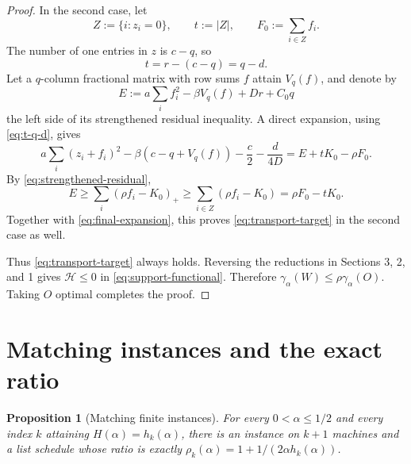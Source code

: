 \documentclass[11pt]{article}
\newtheorem{proposition}[theorem]{Proposition}
\theoremstyle{remark}
\begin{document}
\begin{proof}
In the second case, let
\[
 Z:=\{i:z_i=0\},\qquad t:=|Z|,\qquad
 F_0:=\sum_{i\in Z}f_i.
\]
The number of one entries in $z$ is $c-q$, so
\begin{equation}\label{eq:t-q-d}
 t=r-(c-q)=q-d.
\end{equation}
Let a $q$-column fractional matrix with row sums $f$ attain
$V_q(f)$, and denote by
\[
 E:=a\sum_i f_i^2-\beta V_q(f)+Dr+C_0q
\]
the left side of its strengthened residual inequality.  A direct
expansion, using \eqref{eq:t-q-d}, gives
\begin{equation}\label{eq:final-expansion}
 a\sum_i(z_i+f_i)^2-\beta(c-q+V_q(f))
       -\frac c2-\frac d{4D}
 =E+tK_0-\rho F_0.
\end{equation}
By \eqref{eq:strengthened-residual},
\[
 E\geq\sum_i(\rho f_i-K_0)_+
 \geq\sum_{i\in Z}(\rho f_i-K_0)
 =\rho F_0-tK_0.
\]
Together with \eqref{eq:final-expansion}, this proves
\eqref{eq:transport-target} in the second case as well.

Thus \eqref{eq:transport-target} always holds.  Reversing the reductions
in Sections 3, 2, and 1 gives $\mathcal H\leq0$ in
\eqref{eq:support-functional}.  Therefore
$\gamma_{\alpha}(W)\leq\rho \gamma_{\alpha}(O)$.  Taking $O$ optimal completes the
proof.
\end{proof}

\section{Matching instances and the exact ratio}

\begin{proposition}[Matching finite instances]
\label{prop:matching-instance}
For every $0<\alpha\leq1/2$ and every index $k$ attaining
$H(\alpha)=h_k(\alpha)$, there is an instance on $k+1$ machines and
a list schedule whose ratio is exactly
$\rho_k(\alpha)=1+1/(2\alpha h_k(\alpha))$.
\end{proposition}
\end{document}

